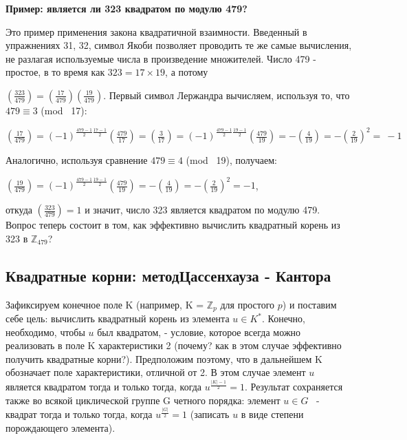 \documentclass{mai_book}
\begin{document}
\begin{beznomera}
{\bf Пример: является ли 323 квадратом по модулю 479?}
\end{beznomera}

Это пример применения закона квадратичной взаимности. Введенный в упражнениях 31, 32, символ Якоби позволяет проводить те же самые вычисления, не разлагая используемые числа в произведение множителей. Число 479 - простое, в то время как $323 = 17\times 19$, а потому

\newpage


$(\frac{323}{479}) = (\frac{17}{479})(\frac{19}{479})$. Первый символ Лержандра вычисляем, используя то, что $479 \equiv 3$ (mod \ 17):

\begin{center}
$(\frac{17}{479}) = (-1)^{\frac{479-1}{2}\frac{17-1}{2}}(\frac{479}{17}) = (\frac{3}{17}) = (-1)^{\frac{479-1}{2}\frac{19-1}{2}}(\frac{479}{19}) = -(\frac{4}{19}) = -(\frac{2}{19})^2 = ~-1$
\end{center}

Аналогично, используя сравнение $479 \equiv 4$ (mod \ 19), получаем:

\begin{center}
$(\frac{19}{479}) = (-1)^{\frac{479-1}{2}\frac{19-1}{2}}(\frac{479}{19}) = -(\frac{4}{19}) = -(\frac{2}{19})^2 = -1$,
\end{center}

откуда $(\frac{323}{479}) = 1$
 и значит, число 323 является квадратом по модулю 479. Вопрос теперь состоит в том, как эффективно вычислить квадратный корень из 323 в $\mathbb{Z}_{479}$?


\subsection{Квадратные корни: метод\newline Цассенхауза - Кантора}


Зафиксируем конечное поле K (например, K = $\mathbb{Z}_p$
 для простого $p$) и поставим себе цель: вычислить квадратный корень из элемента $u \in K^*$. Конечно, необходимо, чтобы $u$
 был квадратом, - условие, которое всегда можно реализовать в поле K характеристики 2 (почему? как в этом случае эффективно получить квадратные корни?). Предположим поэтому, что в дальнейшем K обозначает поле характеристики, отличной от 2. В этом случае элемент $u$ является квадратом тогда и только тогда, когда $u^{\frac{|K|-1}{2}} = 1$. Результат сохраняется также во всякой циклической группе G четного порядка: элемент $u \in G$
 ~- квадрат тогда и только тогда, когда $u^{\frac{|G|}{2}} = 1$
 (записать $u$
 в виде степени порождающего элемента).
\end{document}
